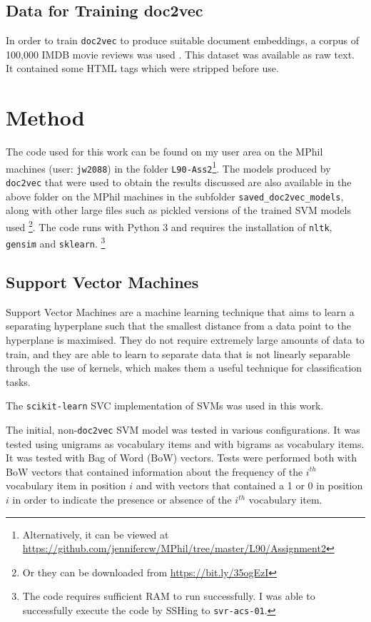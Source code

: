 \documentclass[twocolumn]{article}
\begin{document}
\subsection{Data for Training doc2vec}

In order to train \texttt{doc2vec} to produce suitable document embeddings, a corpus of 100,000 IMDB movie reviews was used \cite{bigimdb}. This dataset was available as raw text. It contained some HTML tags which were stripped before use.

\section{Method}

The code used for this work can be found on my user area on the MPhil machines (user: \texttt{jw2088}) in the folder \texttt{L90-Ass2}\footnote{Alternatively, it can be viewed at \url{https://github.com/jennifercw/MPhil/tree/master/L90/Assignment2}}. The models produced by \texttt{doc2vec} that were used to obtain the results discussed are also available in the above folder on the MPhil machines in the subfolder \texttt{saved\_doc2vec\_models}, along with other large files such as pickled versions of the trained SVM models used \footnote{Or they can be downloaded from \url{https://bit.ly/35ogEzI}}. The code runs with Python 3 and requires the installation of \texttt{nltk}, \texttt{gensim} and \texttt{sklearn}. \footnote{The code requires sufficient RAM to run successfully. I was able to successfully execute the code by SSHing to \texttt{svr-acs-01}.} 

\subsection{Support Vector Machines}

Support Vector Machines are a machine learning technique that aims to learn a separating hyperplane such that the smallest distance from a data point to the hyperplane is maximised. They do not require extremely large amounts of data to train, and they are able to learn to separate data that is not linearly separable through the use of kernels, which makes them a useful technique for classification tasks.

The \texttt{scikit-learn}\cite{scikit-learn} SVC implementation of SVMs was used in this work.

The initial, non-\texttt{doc2vec} SVM model was tested in various configurations. It was tested using unigrams as vocabulary items and with bigrams as vocabulary items. It was tested with Bag of Word (BoW) vectors. Tests were performed both with BoW vectors that contained information about the frequency of the $i^{th}$ vocabulary item in position $i$ and with vectors that contained a 1 or 0 in position $i$ in order to indicate the presence or absence of the $i^{th}$ vocabulary item. 
\end{document}
